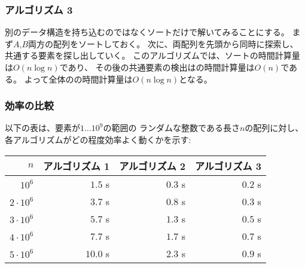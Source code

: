 \subsubsection{アルゴリズム 3}

別のデータ構造を持ち込むのではなくソートだけで解いてみることにする。
まず$A$,$B$両方の配列をソートしておく。
次に、両配列を先頭から同時に探索し、共通する要素を探し出していく。
このアルゴリズムでは、ソートの時間計算量は$O(n \log n)$であり、
その後の共通要素の検出はの時間計算量は$O(n)$である。
よって全体のの時間計算量は$O(n \log n)$となる。


\begin{comment}
\subsubsection{Efficiency comparison}

The following table shows how efficient
the above algorithms are when $n$ varies and
the elements of the lists are random
integers between $1 \ldots 10^9$:

\begin{center}
\begin{tabular}{rrrr}
$n$ & Algorithm 1 & Algorithm 2 & Algorithm 3 \\
\hline
$10^6$ & $1.5$ s & $0.3$ s & $0.2$ s \\
$2 \cdot 10^6$ & $3.7$ s & $0.8$ s & $0.3$ s \\
$3 \cdot 10^6$ & $5.7$ s & $1.3$ s & $0.5$ s \\
$4 \cdot 10^6$ & $7.7$ s & $1.7$ s & $0.7$ s \\
$5 \cdot 10^6$ & $10.0$ s & $2.3$ s & $0.9$ s \\
\end{tabular}
\end{center}
\end{comment}

\subsubsection{効率の比較}

以下の表は、要素が$1 \ldots 10^9$の範囲の
ランダムな整数である長さ$n$の配列に対し、
各アルゴリズムがどの程度効率よく動くかを示す:

\begin{center}
\begin{tabular}{rrrr}
$n$ & アルゴリズム 1 & アルゴリズム 2 & アルゴリズム 3 \\
\hline
$10^6$ & $1.5$ s & $0.3$ s & $0.2$ s \\
$2 \cdot 10^6$ & $3.7$ s & $0.8$ s & $0.3$ s \\
$3 \cdot 10^6$ & $5.7$ s & $1.3$ s & $0.5$ s \\
$4 \cdot 10^6$ & $7.7$ s & $1.7$ s & $0.7$ s \\
$5 \cdot 10^6$ & $10.0$ s & $2.3$ s & $0.9$ s \\
\end{tabular}
\end{center}

